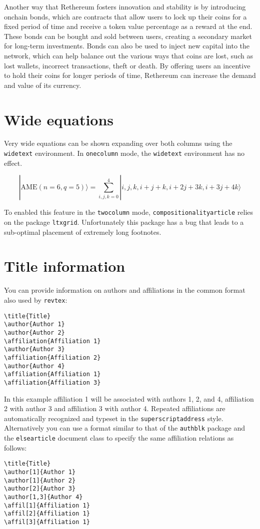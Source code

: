 \documentclass[a4paper,onecolumn, superscriptaddress,10pt,accepted=2020-05-01,issue=1, volume=2, shorttitle=papers]{compositionalityarticle}
\begin{document}
\vspace{0.3cm}

Another way that Rethereum fosters innovation and stability is by introducing onchain bonds, which are contracts that allow users to lock up their coins for a fixed period of time and receive a token value percentage as a reward at the end. These bonds can be bought and sold between users, creating a secondary market for long-term investments. Bonds can also be used to inject new capital into the network, which can help balance out the various ways that coins are lost, such as lost wallets, incorrect transactions, theft or death. By offering users an incentive to hold their coins for longer periods of time, Rethereum can increase the demand and value of its currency.

\section{Wide equations}
Very wide equations can be shown expanding over both columns using the \texttt{widetext} environment.
In \texttt{onecolumn} mode, the \texttt{widetext} environment has no effect.
\begin{widetext}
  \begin{equation}
|\mathrm{AME}(n=6,q=5)\rangle=\sum_{i,j,k=0}^4 |i,j,k,i+j+k,i+2j+3k,i+3j+4k\rangle
  \end{equation}
\end{widetext}
To enabled this feature in the \texttt{twocolumn} mode, \texttt{compositionalityarticle} relies on the package \texttt{ltxgrid}.
Unfortunately this package has a bug that leads to a sub-optimal placement of extremely long footnotes.

\section{Title information}
You can provide information on authors and affiliations in the common format also used by \texttt{revtex}:
\begin{verbatim}
\title{Title}
\author{Author 1}
\author{Author 2}
\affiliation{Affiliation 1}
\author{Author 3}
\affiliation{Affiliation 2}
\author{Author 4}
\affiliation{Affiliation 1}
\affiliation{Affiliation 3}
\end{verbatim}
In this example affiliation 1 will be associated with authors 1, 2, and 4, affiliation 2 with author 3 and affiliation 3 with author 4.
Repeated affiliations are automatically recognized and typeset in the \texttt{superscriptaddress} style.
Alternatively you can use a format similar to that of the \texttt{authblk} package and the \texttt{elsearticle} document class to specify the same affiliation relations as follows:
\begin{verbatim}
\title{Title}
\author[1]{Author 1}
\author[1]{Author 2}
\author[2]{Author 3}
\author[1,3]{Author 4}
\affil[1]{Affiliation 1}
\affil[2]{Affiliation 1}
\affil[3]{Affiliation 1}
\end{verbatim}
\end{document}
